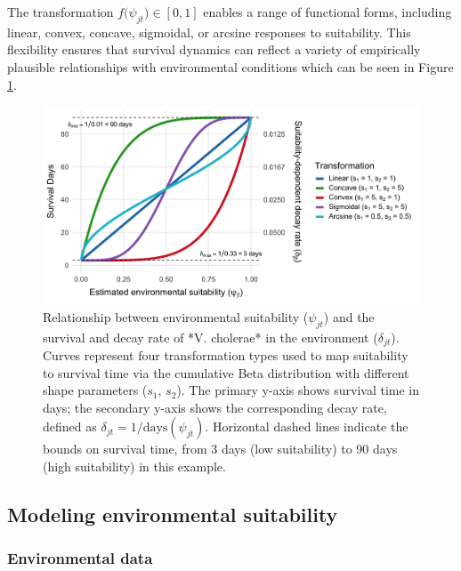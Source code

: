 \documentclass[
]{book}
\begin{document}
The transformation \(f\big(\psi_{jt}\big) \in [0, 1]\) enables a range of functional forms, including linear, convex, concave, sigmoidal, or arcsine responses to suitability. This flexibility ensures that survival dynamics can reflect a variety of empirically plausible relationships with environmental conditions which can be seen in Figure \ref{fig:vibrio-decay-rate}.

\begin{figure}

{\centering \includegraphics[width=1\linewidth]{figures/vibrio_decay_rate} 

}

\caption{Relationship between environmental suitability ($\psi_{jt}$) and the survival and decay rate of *V. cholerae* in the environment ($\delta_{jt}$). Curves represent four transformation types used to map suitability to survival time via the cumulative Beta distribution with different shape parameters ($s_1$, $s_2$). The primary y-axis shows survival time in days; the secondary y-axis shows the corresponding decay rate, defined as $\delta_{jt} = 1/\text{days}(\psi_{jt})$. Horizontal dashed lines indicate the bounds on survival time, from 3 days (low suitability) to 90 days (high suitability) in this example.}\label{fig:vibrio-decay-rate}
\end{figure}

\subsection{Modeling environmental suitability}\label{modeling-environmental-suitability}

\subsubsection{Environmental data}\label{environmental-data}
\end{document}
